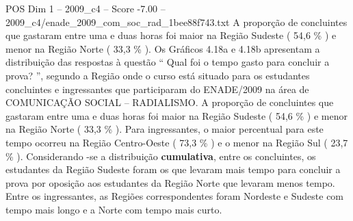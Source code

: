 \begin{textsample}{POS Dim 1 – 2009\_c4 – Score -7.00 – 2009\_c4/enade\_2009\_com\_soc\_rad\_1bee88f743.txt}
A proporção de concluintes que gastaram entre uma e duas horas foi maior na Região Sudeste ( 54,6 \% ) e menor na Região Norte ( 33,3 \% ).
Os Gráficos 4.18a e 4.18b apresentam a distribuição das respostas à questão “ Qual foi o tempo gasto para concluir a prova? ”, segundo a Região onde o curso está situado para os estudantes concluintes e ingressantes que participaram do ENADE/2009 na área de COMUNICAÇÃO SOCIAL – RADIALISMO.
A proporção de concluintes que gastaram entre uma e duas horas foi maior na Região Sudeste ( 54,6 \% ) e menor na Região Norte ( 33,3 \% ).
Para ingressantes, o maior percentual para este tempo ocorreu na Região Centro-Oeste ( 73,3 \% ) e o menor na Região Sul ( 23,7 \% ).
Considerando -se a distribuição \textbf{cumulativa}, entre os concluintes, os estudantes da Região Sudeste foram os que levaram mais tempo para concluir a prova por oposição aos estudantes da Região Norte que levaram menos tempo.
Entre os ingressantes, as Regiões correspondentes foram Nordeste e Sudeste com tempo mais longo e a Norte com tempo mais curto.

\end{textsample}
